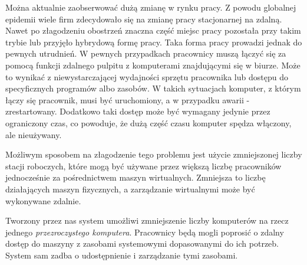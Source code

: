 \documentclass[../wstep.tex]{subfiles}
\begin{document}
Można aktualnie zaobserwować dużą zmianę w rynku pracy.
Z powodu globalnej epidemii wiele firm zdecydowało się na zmianę pracy stacjonarnej na zdalną.
Nawet po złagodzeniu obostrzeń znaczna część miejsc pracy pozostała przy takim trybie lub przyjęło hybrydową formę pracy.
Taka forma pracy prowadzi jednak do pewnych utrudnień.
W pewnych przypadkach pracownicy muszą łączyć się za pomocą funkcji zdalnego pulpitu z komputerami znajdującymi się w biurze.
Może to wynikać z niewystarczającej wydajności sprzętu pracownika lub dostępu do specyficznych programów albo zasobów.
W takich sytuacjach komputer, z którym łączy się pracownik, musi być uruchomiony, a w przypadku awarii - zrestartowany.
Dodatkowo taki dostęp może być wymagany jedynie przez ograniczony czas, co powoduje, że dużą część czasu komputer spędza włączony, ale nieużywany.

Możliwym sposobem na złagodzenie tego problemu jest użycie zmniejszonej liczby stacji roboczych, które mogą być używane przez większą liczbę pracowników jednocześnie za pośrednictwem maszyn wirtualnych.
Zmniejsza to liczbę działających maszyn fizycznych, a zarządzanie wirtualnymi może być wykonywane zdalnie.

Tworzony przez nas system umożliwi zmniejszenie liczby komputerów na rzecz jednego \textit{przezroczystego komputera}.
Pracownicy będą mogli poprosić o zdalny dostęp do maszyny z zasobami systemowymi dopasowanymi do ich potrzeb.
System sam zadba o udostępnienie i zarządzanie tymi zasobami.
\end{document}
